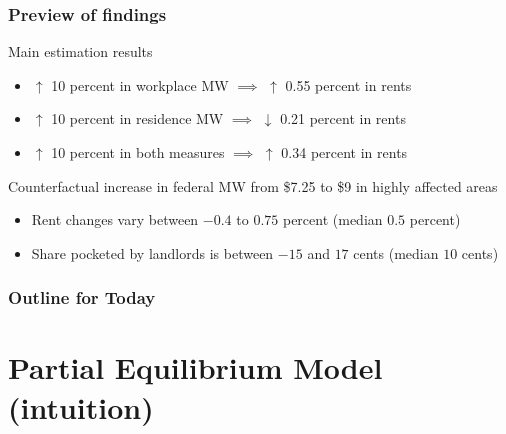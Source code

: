\documentclass[aspectratio=169, t]{beamer}
\begin{document}
\begin{frame}
    \frametitle{Preview of findings}
    
    Main estimation results
    \begin{itemize}
        \vspace{1mm}
        \item $\uparrow$ 10 percent in {\color{blue} workplace MW}
        $\implies$ $\uparrow$ 0.55 percent in rents
        \vspace{1mm}
        \item $\uparrow$ 10 percent in {\color{red} residence MW}
        $\implies$ $\downarrow$ 0.21 percent in rents
        \vspace{1mm}
        \item $\uparrow$ 10 percent in both measures $\implies$ $\uparrow$ 0.34 percent in rents
    \end{itemize}
    
    \vspace{5mm}
    \pause
    Counterfactual increase in federal MW from \$7.25 to \$9 in highly affected areas
    \begin{itemize}
        \vspace{1mm}
        \item Rent changes vary between $-0.4$ to $0.75$ percent (median $0.5$ percent)
        \vspace{1mm}
        \item Share pocketed by landlords is between $-15$ and $17$ cents (median $10$ cents)
    \end{itemize}
\end{frame}

\begin{frame}
    \frametitle{Outline for Today}
    \tableofcontents[hideallsubsections]
\end{frame}

\section{Partial Equilibrium Model (intuition)}
\end{document}
